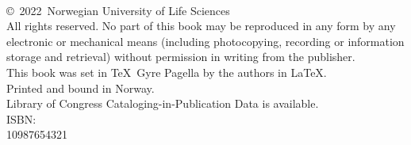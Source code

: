 \thispagestyle{empty}
\begin{fullwidth}
\vfill
\noindent\\[3in]
\copyright\ 2022\ Norwegian University of Life Sciences\\[0.2in]
All rights reserved. No part of this book may be reproduced in any
form by any electronic or mechanical means (including photocopying,
recording or information storage and retrieval)
without permission in writing from the publisher.\\[0.2in]
This book was set in \TeX\ Gyre Pagella by the authors in \LaTeX.\\
Printed and bound in Norway.\\[0.2in]
Library of Congress Cataloging-in-Publication Data is available.\\[0.2in]
ISBN: \\[0.2in]
 10\hspace{1em}9\hspace{1em}8\hspace{1em}7\hspace{1em}6\hspace{1em}5\hspace{1em}4\hspace{1em}3\hspace{1em}2\hspace{1em}1
\end{fullwidth}

\clearpage
